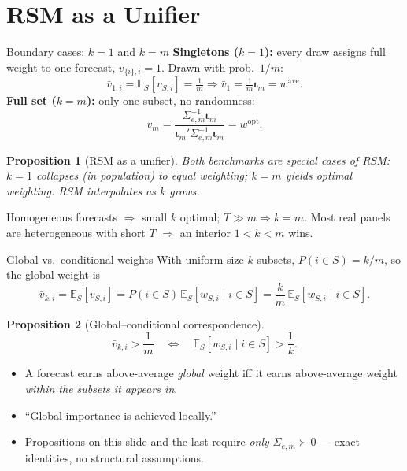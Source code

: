 \documentclass[11pt,aspectratio=169]{beamer}
\newcommand{\Sig}{\Sigma_{e,m}}
\newcommand{\wopt}{w^{\mathrm{opt}}}
\newcommand{\wave}{w^{\mathrm{ave}}}
\newcommand{\E}{\mathbb{E}}
\newcommand{\im}{\bm{\iota}_m}
\newtheorem{propositionX}{Proposition}
\begin{document}
\section{RSM as a Unifier}

\begin{frame}{Boundary cases: $k=1$ and $k=m$}
  \textbf{Singletons ($k=1$):} every draw assigns full weight to one
  forecast, $v_{\{i\},i}=1$. Drawn with prob.\ $1/m$:
  \[
    \bar v_{1,i}=\E_S[v_{S,i}]=\tfrac1m\Rightarrow
    \bar v_1=\tfrac1m\im=\wave .
  \]
  \textbf{Full set ($k=m$):} only one subset, no randomness:
  \[
    \bar v_m=\frac{\Sig^{-1}\im}{\im'\Sig^{-1}\im}=\wopt .
  \]
  \begin{propositionX}[RSM as a unifier]
    Both benchmarks are special cases of RSM: $k=1$ collapses (in
    population) to \emph{equal weighting}; $k=m$ yields \emph{optimal
    weighting}. RSM interpolates as $k$ grows.
  \end{propositionX}
  \footnotesize Homogeneous forecasts $\Rightarrow$ small $k$ optimal;
  $T\gg m \Rightarrow k=m$. Most real panels are heterogeneous with short
  $T$ $\Rightarrow$ an interior $1<k<m$ wins.
\end{frame}

\begin{frame}{Global vs.\ conditional weights}
  With uniform size-$k$ subsets, $P(i\in S)=k/m$, so the global weight is
  \[
    \bar v_{k,i}=\E_S[v_{S,i}]
    =P(i\in S)\,\E_S[w_{S,i}\mid i\in S]
    =\frac{k}{m}\,\E_S[w_{S,i}\mid i\in S].
  \]
  \begin{propositionX}[Global--conditional correspondence]
    \[
      \bar v_{k,i}>\frac1m
      \quad\Longleftrightarrow\quad
      \E_S[w_{S,i}\mid i\in S]>\frac1k .
    \]
  \end{propositionX}
  \begin{itemize}
    \item A forecast earns above-average \emph{global} weight iff it earns
      above-average weight \emph{within the subsets it appears in}.
    \item ``Global importance is achieved locally.''
    \item Propositions on this slide and the last require \emph{only}
      $\Sig\succ0$ --- exact identities, no structural assumptions.
  \end{itemize}
\end{frame}
\end{document}
